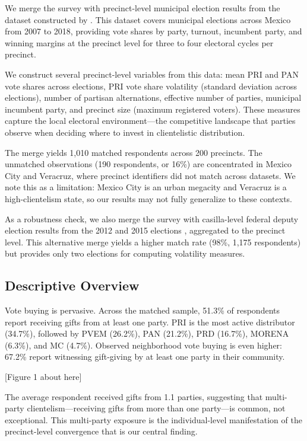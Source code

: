 \documentclass[12pt,letterpaper]{article}
\begin{document}
We merge the survey with precinct-level municipal election results from the dataset constructed by \citet{larreguy2016parties}. This dataset covers municipal elections across Mexico from 2007 to 2018, providing vote shares by party, turnout, incumbent party, and winning margins at the precinct level for three to four electoral cycles per precinct.

We construct several precinct-level variables from this data: mean PRI and PAN vote shares across elections, PRI vote share volatility (standard deviation across elections), number of partisan alternations, effective number of parties, municipal incumbent party, and precinct size (maximum registered voters). These measures capture the local electoral environment---the competitive landscape that parties observe when deciding where to invest in clientelistic distribution.

The merge yields 1,010 matched respondents across 200 precincts. The unmatched observations (190 respondents, or 16\%) are concentrated in Mexico City and Veracruz, where precinct identifiers did not match across datasets. We note this as a limitation: Mexico City is an urban megacity and Veracruz is a high-clientelism state, so our results may not fully generalize to these contexts.

As a robustness check, we also merge the survey with casilla-level federal deputy election results from the 2012 and 2015 elections \citep{magar2018}, aggregated to the precinct level. This alternative merge yields a higher match rate (98\%, 1,175 respondents) but provides only two elections for computing volatility measures.

\subsection{Descriptive Overview}

Vote buying is pervasive. Across the matched sample, 51.3\% of respondents report receiving gifts from at least one party. PRI is the most active distributor (34.7\%), followed by PVEM (26.2\%), PAN (21.2\%), PRD (16.7\%), MORENA (6.3\%), and MC (4.7\%). Observed neighborhood vote buying is even higher: 67.2\% report witnessing gift-giving by at least one party in their community.

[Figure 1 about here]

The average respondent received gifts from 1.1 parties, suggesting that multi-party clientelism---receiving gifts from more than one party---is common, not exceptional. This multi-party exposure is the individual-level manifestation of the precinct-level convergence that is our central finding.
\end{document}
